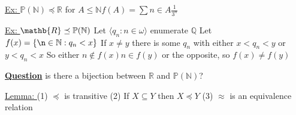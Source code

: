 \documentclass{article}
\begin{document}
    \underline{Ex: } $\mathbb{P}(\mathbb{N}) \preceq \mathbb{R}$
    for $A \leq \mathbb{N} f(A) = \sum{n \in A} \frac{1}{3^n}$

    \underline{Ex: } $\mathb{R} \preceq \mathbb{P}(\mathbb{N})$
    Let $\langle q_n : n \in \omega \rangle$ enumerate $\mathbb{Q}$
    Let $f(x) = \set{\n \in \mathbb{N} : q_n < x}$
    If $x \neq y$ there is some $q_n$ with either $x < q_n < y$ or $y < q_n < x$
    So either $n \notin f(x) n \in f(y)$ or the opposite, so $f(x) \neq f(y)$

    \underline{\textbf{Question}} is there a bijection between $\mathbb{R}$ and $\mathbb{P}(\mathbb{N})$?

    \underline{Lemma: }
    (1) $\preceq$ is transitive
    (2) If $X \subseteq Y$ then $X \preceq Y$
    (3) $\approx$ is an equivalence relation

    
\end{document}
